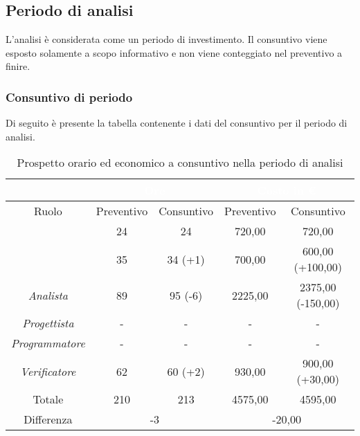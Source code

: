 \subsection{Periodo di analisi}
L'analisi è considerata come un periodo di investimento. Il consuntivo viene esposto solamente a scopo informativo e non viene conteggiato nel preventivo a finire.
\subsubsection{Consuntivo di periodo}
Di seguito è presente la tabella contenente i dati del consuntivo per il periodo di analisi.
\begin{table}[H]
	\centering
	\begin{tabular}{|c|c|c|c|c|}
		\rowcolor{darkblue} 
		&\multicolumn{2}{c|}{\textcolor{white}{Ore}}&\multicolumn{2}{c|}{\textcolor{white}{Costo in €}}\\ \hline
		Ruolo			&	Preventivo			&	Consuntivo		&	Preventivo	&	Consuntivo\\ \hline
		{\Responsabile}		&	24					&	24				&	720,00		&	720,00 \\ \hline
		{\Amministratore}	&	35					&	34 (+1)			&	700,00		&	600,00 (+100,00) \\ \hline
		\textit{Analista}	&	89					&	95 (-6)			&	2225,00		&	2375,00 (-150,00) \\ \hline
		\textit{Progettista}& 	-					&	- 				& 	-			&  	- \\ \hline
		\textit{Programmatore}& -					& 	-				& 	-			&  	- \\ \hline
		\textit{Verificatore}&	62					&	60 (+2)			&	930,00		&	900,00 (+30,00) \\ \hline
		Totale				&	210					&	213				&	4575,00		&	4595,00 \\ \hline
		Differenza			& 	\multicolumn{2}{c|}{-3} 			&\multicolumn{2}{c|}{-20,00}\\ \hline
	\end{tabular}
	\caption{Prospetto orario ed economico a consuntivo nella periodo di analisi}
\end{table}
